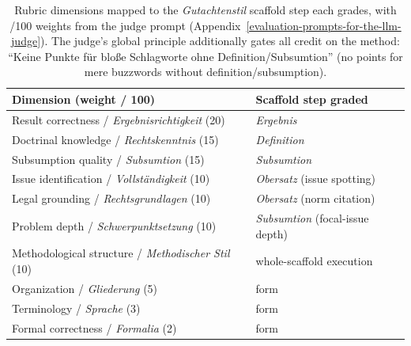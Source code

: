 \begin{table}[t]
\centering
\footnotesize
\setlength{\tabcolsep}{4pt}
\begin{tabular}{@{}p{}p{}@{}}
\toprule
\textbf{Dimension (weight / 100)} & \textbf{Scaffold step graded} \\
\midrule
Result correctness / \emph{Ergebnisrichtigkeit} (20) & \emph{Ergebnis} \\
Doctrinal knowledge / \emph{Rechtskenntnis} (15) & \emph{Definition} \\
Subsumption quality / \emph{Subsumtion} (15) & \emph{Subsumtion} \\
Issue identification / \emph{Vollständigkeit} (10) & \emph{Obersatz} (issue spotting) \\
Legal grounding / \emph{Rechtsgrundlagen} (10) & \emph{Obersatz} (norm citation) \\
Problem depth / \emph{Schwerpunktsetzung} (10) & \emph{Subsumtion} (focal-issue depth) \\
Methodological structure / \emph{Methodischer Stil} (10) & whole-scaffold execution \\
Organization / \emph{Gliederung} (5) & form \\
Terminology / \emph{Sprache} (3) & form \\
Formal correctness / \emph{Formalia} (2) & form \\
\bottomrule
\end{tabular}
\caption{Rubric dimensions mapped to the \emph{Gutachtenstil} scaffold step each grades, with /100 weights from the judge prompt (Appendix~\ref{evaluation-prompts-for-the-llm-judge}). The judge's global principle additionally gates all credit on the method: ``Keine Punkte für bloße Schlagworte ohne Definition/Subsumtion'' (no points for mere buzzwords without definition/subsumption).}
\label{tbl-rubric-mapping}
\end{table}
